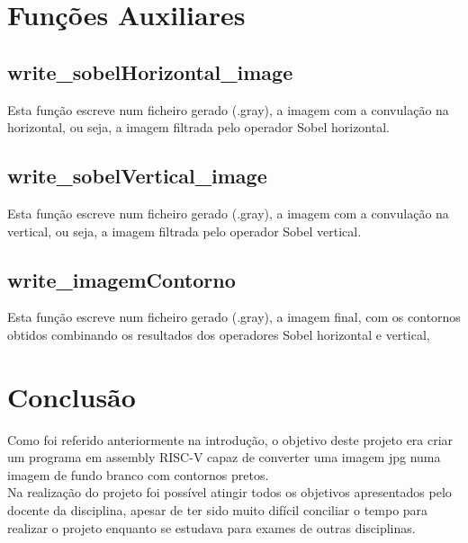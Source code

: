 \documentclass{report}
\begin{document}
\chapter{Funções Auxiliares}

\section{write\_sobelHorizontal\_image}
Esta função escreve num ficheiro gerado (.gray), a imagem com a convulação na horizontal, ou seja, a imagem  filtrada pelo operador Sobel horizontal.

\section{write\_sobelVertical\_image}
Esta função escreve num ficheiro gerado (.gray), a imagem com a convulação na vertical, ou seja, a imagem filtrada pelo operador Sobel vertical.

\section{write\_imagemContorno}
Esta função escreve num ficheiro gerado (.gray), a imagem final, com os contornos obtidos combinando os 
resultados dos operadores Sobel horizontal e vertical,

\chapter{Conclusão}
Como foi referido anteriormente na introdução, o objetivo deste projeto era criar um programa em assembly RISC-V capaz de converter uma imagem jpg numa imagem de fundo branco com contornos pretos.\\
Na realização do projeto foi possível atingir todos os objetivos apresentados pelo docente da disciplina, apesar de ter sido muito difícil conciliar o tempo para realizar o projeto enquanto se estudava para exames de outras disciplinas.\\
\end{document}
